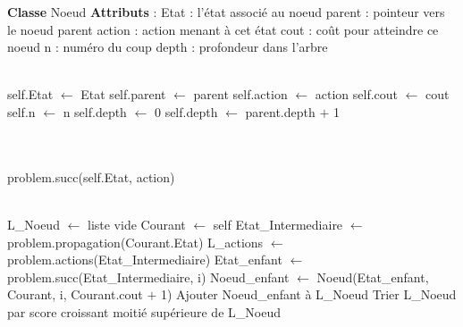 \documentclass[11pt,a4paper]{article}
\begin{document}
\begin{tcolorbox}[title=Structure de la classe Noeud,colback=yellow!10!white,colframe=yellow!95!black]
\begin{algorithm}[H]
\begin{algorithmic}[1]
    \State \textbf{Classe} Noeud
    \State \textbf{Attributs} :
    \State \hspace{1em} Etat : l'état associé au noeud
    \State \hspace{1em} parent : pointeur vers le noeud parent
    \State \hspace{1em} action : action menant à cet état
    \State \hspace{1em} cout : coût pour atteindre ce noeud
    \State \hspace{1em} n : numéro du coup
    \State \hspace{1em} depth : profondeur dans l'arbre

    \\

        \State self.Etat $\gets$ Etat
        \State self.parent $\gets$ parent
        \State self.action $\gets$ action
        \State self.cout $\gets$ cout
        \State self.n $\gets$ n
        \State self.depth $\gets$ 0
            \State self.depth $\gets$ parent.depth $+$ 1
        \EndIf
    \EndProcedure

    \\
    \\

        \State \Return problem.succ(self.Etat, action)
    \EndFunction

    \\

        \State L\_Noeud $\gets$ liste vide
        \State Courant $\gets$ self
        \State Etat\_Intermediaire $\gets$ problem.propagation(Courant.Etat)
        \State L\_actions $\gets$ problem.actions(Etat\_Intermediaire)
            \State Etat\_enfant $\gets$ problem.succ(Etat\_Intermediaire, i)
            \State Noeud\_enfant $\gets$ Noeud(Etat\_enfant, Courant, i, Courant.cout $+$ 1)
            \State Ajouter Noeud\_enfant à L\_Noeud
        \EndFor
        \State Trier L\_Noeud par score croissant
        \State \Return moitié supérieure de L\_Noeud
    \EndFunction

    \\

\end{algorithmic}
\end{algorithm}
\end{tcolorbox}
\end{document}
